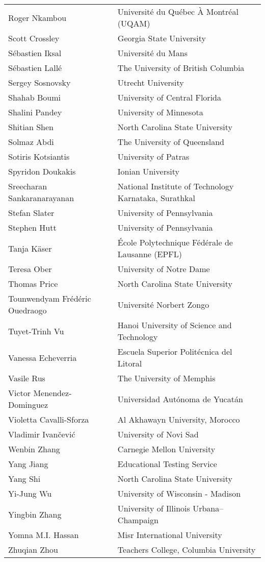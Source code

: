 \documentclass[letterpaper,11pt,oneside]{book} %
\begin{document}
\begin{longtable}[]{@{}
  >{\raggedright\arraybackslash}p{}
  >{\raggedright\arraybackslash}p{}@{}}
Roger Nkambou & Université du Québec À Montréal (UQAM) \\
Scott Crossley & Georgia State University \\
Sébastien Iksal & Université du Mans \\
Sébastien Lallé & The University of British Columbia \\
Sergey Sosnovsky & Utrecht University \\
Shahab Boumi & University of Central Florida \\
Shalini Pandey & University of Minnesota \\
Shitian Shen & North Carolina State University \\
Solmaz Abdi & The University of Queensland \\
Sotiris Kotsiantis & University of Patras \\
Spyridon Doukakis & Ionian University \\
Sreecharan Sankaranarayanan & National Institute of Technology
Karnataka, Surathkal \\
Stefan Slater & University of Pennsylvania \\
Stephen Hutt & University of Pennsylvania \\
Tanja Käser & École Polytechnique Fédérale de Lausanne (EPFL) \\
Teresa Ober & University of Notre Dame \\
Thomas Price & North Carolina State University \\
Tounwendyam Frédéric Ouedraogo & Université Norbert Zongo \\
Tuyet-Trinh Vu & Hanoi University of Science and Technology \\
Vanessa Echeverria & Escuela Superior Politécnica del Litoral \\
Vasile Rus & The University of Memphis \\
Victor Menendez-Dominguez & Universidad Autónoma de Yucatán \\
Violetta Cavalli-Sforza & Al Akhawayn University, Morocco \\
Vladimir Ivančević & University of Novi Sad \\
Wenbin Zhang & Carnegie Mellon University \\
Yang Jiang & Educational Testing Service \\
Yang Shi & North Carolina State University \\
Yi-Jung Wu & University of Wisconsin - Madison \\
Yingbin Zhang & University of Illinois Urbana--Champaign \\
Yomna M.I. Hassan & Misr International University \\
Zhuqian Zhou & Teachers College, Columbia University \\
\end{longtable}
\end{document}
